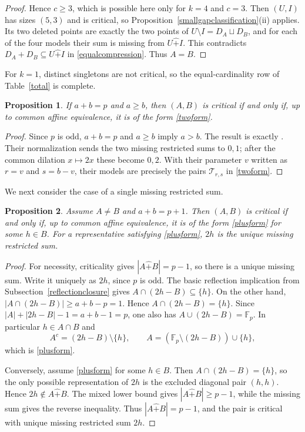 \documentclass[12pt]{article}
\newtheorem{proposition}{Proposition}[section]
\theoremstyle{remark}
\newcommand{\F}{\mathbb{F}_p}
\newcommand{\rs}{\mathbin{\widehat+}}
\begin{document}
\begin{proof}
Hence $c\ge3$, which is possible here only for $k=4$ and $c=3$.
Then $(U,I)$ has sizes $(5,3)$ and is critical, so
Proposition~\ref{smallgapclassification}(ii) applies.  Its two deleted
points are exactly the two points of $U\setminus I=D_A\sqcup D_B$, and
for each of the four models their sum is missing from $U\rs I$.  This
contradicts $D_A+D_B\subseteq U\rs I$ in \eqref{equalcompression}.
Thus $A=B$.
\end{proof}

For $k=1$, distinct singletons are not critical, so the equal-cardinality
row of Table~\ref{total} is complete.

\begin{proposition}\label{twomissingclassification}
If $a+b=p$ and $a\ge b$, then $(A,B)$ is critical if and only if,
up to common affine equivalence, it is of the form \eqref{twoform}.
\end{proposition}
\begin{proof}
Since $p$ is odd, $a+b=p$ and $a\ge b$ imply $a>b$.  The result is
exactly \cite[Theorem 1.1]{HLY}.  Their normalization sends the two
missing restricted sums to $0,1$; after the common dilation
$x\mapsto2x$ these become $0,2$.  With their parameter $v$ written as
$r=v$ and $s=b-v$, their models are precisely the pairs
$\mathcal T_{r,s}$ in \eqref{twoform}.
\end{proof}

We next consider the case of a single missing restricted sum.

\begin{proposition}\label{pplus}
Assume $A\ne B$ and $a+b=p+1$.  Then $(A,B)$ is critical if and only if,
up to common affine equivalence, it is of the form \eqref{plusform} for
some $h\in B$.  For a representative satisfying \eqref{plusform}, $2h$
is the unique missing restricted sum.
\end{proposition}
\begin{proof}
For necessity, criticality gives $|A\rs B|=p-1$, so there is a unique
missing sum.  Write it uniquely as $2h$, since $p$ is odd.
The basic reflection implication from Subsection~\ref{reflectionclosure}
gives $A\cap(2h-B)\subseteq\{h\}$.  On the other hand,
$|A\cap(2h-B)|\ge a+b-p=1$.  Hence $A\cap(2h-B)=\{h\}$.  Since
$|A|+|2h-B|-1=a+b-1=p$, one also has $A\cup(2h-B)=\F$.  In particular $h\in A\cap B$ and
\[
 A^c=(2h-B)\setminus\{h\},\qquad
 A=(\F\setminus(2h-B))\cup\{h\},
\]
which is \eqref{plusform}.

Conversely, assume \eqref{plusform} for some $h\in B$.  Then
$A\cap(2h-B)=\{h\}$, so the only possible representation of $2h$ is
the excluded diagonal pair $(h,h)$.  Hence $2h\notin A\rs B$.
The mixed lower bound gives $|A\rs B|\ge p-1$, while the missing sum
gives the reverse inequality.  Thus $|A\rs B|=p-1$, and the pair is
critical with unique missing restricted sum $2h$.
\end{proof}
\end{document}
